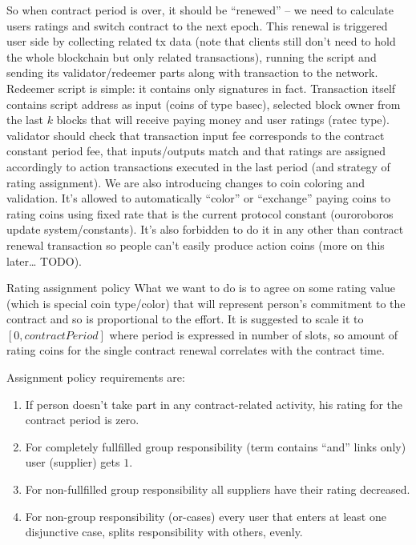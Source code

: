 \documentclass[]{itmo-student-thesis}
\begin{document}
So when contract period is over, it should be “renewed” -- we need to
calculate users ratings and switch contract to the next epoch. This
renewal is triggered user side by collecting related tx data (note
that clients still don’t need to hold the whole blockchain but only
related transactions), running the script and sending its
validator/redeemer parts along with transaction to the
network. Redeemer script is simple: it contains only signatures in
fact. Transaction itself contains script address as input (coins of
type basec), selected block owner from the last $k$ blocks that will
receive paying money and user ratings (ratec type). validator should
check that transaction input fee corresponds to the contract constant
period fee, that inputs/outputs match and that ratings are assigned
accordingly to action transactions executed in the last period (and
strategy of rating assignment). We are also introducing changes to
coin coloring and validation. It’s allowed to automatically “color” or
“exchange” paying coins to rating coins using fixed rate that is the
current protocol constant (ouroroboros update system/constants). It’s
also forbidden to do it in any other than contract renewal transaction
so people can’t easily produce action coins (more on this later…
TODO).

Rating assignment policy What we want to do is to agree on some rating
value (which is special coin type/color) that will represent person’s
commitment to the contract and so is proportional to the effort. It is
suggested to scale it to $[0,contractPeriod]$ where period is expressed
in number of slots, so amount of rating coins for the single contract
renewal correlates with the contract time.

Assignment policy requirements are:

\begin{enumerate}

\item If person doesn’t take part in any contract-related activity,
  his rating for the contract period is zero.

\item For completely fullfilled group responsibility (term contains
  “and” links only) user (supplier) gets $1$.

\item For non-fullfilled group responsibility all suppliers have their
  rating decreased.

\item For non-group responsibility (or-cases) every user that enters
  at least one disjunctive case, splits responsibility with others,
  evenly.

\end{enumerate}
\end{document}
